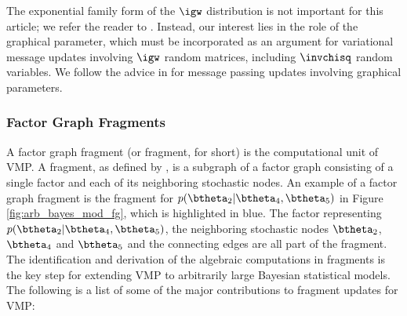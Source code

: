 \documentclass[12pt]{article}
\theoremstyle{plain}
\theoremstyle{definition}
\theoremstyle{remark}
\begin{document}
The exponential family form of the $\igw$ distribution is not important for this article; we refer the reader to
. Instead, our interest lies in the role of the graphical parameter, which must be
incorporated as an argument for variational message updates involving $\igw$ random matrices, including
$\invchisq$ random variables. We follow the advice in  for message passing
updates involving graphical parameters.


\subsubsection{Factor Graph Fragments}
\label{sec:fg_frag}

A factor graph fragment (or fragment, for short) is the computational unit of VMP.
A fragment, as defined by ,
is a subgraph of a factor graph
consisting of a single factor and each of its neighboring stochastic nodes.
An example of a factor graph fragment is the fragment for $p (\btheta_2 | \btheta_4, \btheta_5)$ in Figure
\ref{fig:arb_bayes_mod_fg}, which is highlighted in blue. The factor representing $p (\btheta_2 | \btheta_4, \btheta_5)$,
the neighboring stochastic nodes $\btheta_2$, $\btheta_4$ and $\btheta_5$ and the connecting edges are all
part of the fragment.
The identification and derivation of
the algebraic computations in fragments is the key step for extending VMP to arbitrarily large Bayesian statistical
models. The following is a list of some of the major contributions to fragment updates for VMP:
\end{document}
